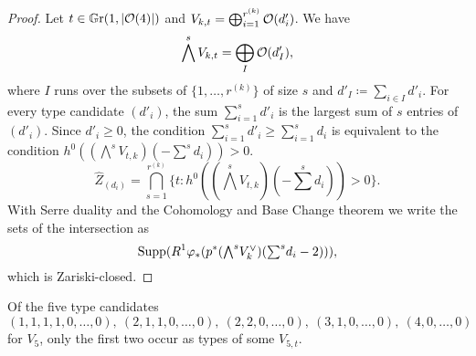 \begin{proof}
Let $t\in \mathbb G \mathrm r(1,\lvert\mathcal{O}(4)\rvert)$ and $V_{k,t} = \bigoplus_{i=1}^{r^{(k)}} \mathcal{O}(d'_i)$. We have
\[
\bigwedge^s V_{k,t} = \bigoplus_{I} \mathcal{O}(d_I'),
\]
where $I$ runs over the subsets of $\{1,\dotsc, r^{(k)}\}$ of size $s$ and $d'_I\coloneqq \sum_{i\in I} d'_i$.
For every type candidate $(d'_i)$, the sum $\sum_{i=1}^s d'_i$ is the largest sum of $s$ entries of $(d'_i)$. Since $d'_i \geq 0$, the condition $\sum_{i=1}^s d'_i \geq \sum_{i=1}^s d_i$ is equivalent to the condition $h^0((\textstyle{\bigwedge}^{s} V_{t,k})(-\textstyle{\sum}^s d_i)) > 0$.
\[
	\widehat Z_{(d_i)} = \bigcap_{s=1}^{r^{(k)}} \{t : h^0((\textstyle{\bigwedge}^{s} V_{t,k})(-\textstyle{\sum}^s d_i)) > 0\}.
\]
With Serre duality and the Cohomology and Base Change theorem we write the sets of the intersection as 
\[
	\operatorname{Supp}(R^1 \varphi_{*} (p^{*} (\textstyle{\bigwedge}^{s} V_k^\vee )(\textstyle{\sum}^s d_i - 2))),
\]
which is Zariski-closed.
\end{proof}

\begin{proposition}
Of the five type candidates
\[
(1,1,1,1,0,\dotsc,0),\ (2,1,1,0,\dotsc,0),\ (2,2,0,\dotsc,0),\ (3,1,0,\dotsc,0),\ (4,0,\dotsc,0)
\]
for $V_5$, only the first two occur as types of some $V_{5,t}$.
\end{proposition}

